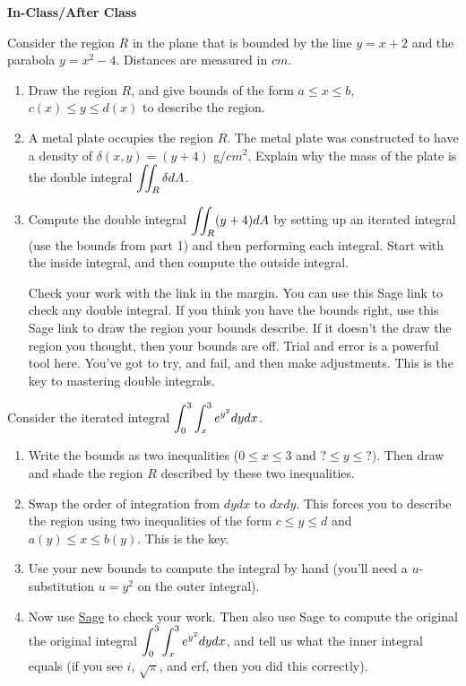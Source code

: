 \newpage

\Large \textbf{In-Class/After Class}\\
\normalsize

\begin{problem}
Consider the region $R$ in the plane that is bounded by the line $y=x+2$ and the parabola $y=x^2-4$. Distances are measured in $cm$. 
\begin{enumerate}
 \item Draw the region $R$, and give bounds of the form $a\leq x\leq b$, $c(x)\leq y\leq d(x)$ to describe the region.
 \item A metal plate occupies the region $R$. The metal plate was constructed to have a density of $\delta (x,y)=(y+4)$ g/$cm^2$.  Explain why the mass of the plate is the double integral $\displaystyle\iint_R \delta dA$.  
 \item {}
Compute the double integral $\displaystyle\iint_R (y+4) dA$ by setting up an iterated integral (use the bounds from part 1) and then performing each integral. Start with the inside integral, and then compute the outside integral. 

Check your work with the link in the margin. You can use this Sage link to check any double integral. If you think you have the bounds right, use this Sage link to draw the region your bounds describe. If it doesn't the draw the region you thought, then your bounds are off. Trial and error is a powerful tool here.  You've got to try, and fail, and then make adjustments.  This is the key to mastering double integrals.
\end{enumerate}

\end{problem}


\begin{problem}
Consider the iterated integral $\displaystyle \int_0^3\int_x^3 e^{y^2}dydx$.
\begin{enumerate}
 \item Write the bounds as two inequalities ($0\leq x\leq 3$ and $?\leq y\leq ?$). Then draw and shade the region $R$ described by these two inequalities. 
 \item Swap the order of integration from $dydx$ to $dxdy$. This forces you to describe the region using two inequalities of the form $c\leq y\leq d$ and $a(y)\leq x\leq b(y)$. This is the key.
 \item Use your new bounds to compute the integral by hand (you'll need a $u$-substitution $u=y^2$ on the outer integral). 
 \item Now use \href{http://bmw.byuimath.com/dokuwiki/doku.php?id=double_integral_calculator}{Sage} to check your work. Then also use Sage to compute the original the original integral $\displaystyle \int_0^3\int_x^3 e^{y^2}dydx$, and tell us what the inner integral equals (if you see $i$, $\sqrt{\pi}$, and erf, then you did this correctly).
\end{enumerate}
\end{problem}

